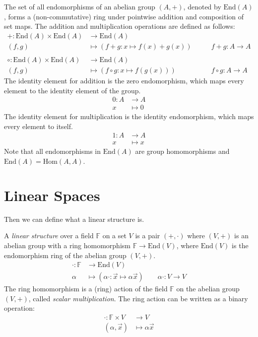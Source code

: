 \documentclass[
	11pt, %
	fleqn, %
	a4paper, %
]{LegrandOrangeBook}
\newcommand{\End}[1]{\text{End}(#1)} %
\newcommand{\Hom}{\text{Hom}} %
\newcommand{\F}{\mathbb{F}} %
\begin{document}
\begin{definition}
    The set of all endomorphisms of an abelian group $(A, +)$, denoted by $\End{A}$, forms a (non-commutative) ring under pointwise addition and composition of set maps. The addition and multiplication operations are defined as follows:
    \[
        \begin{split}
            + : \End{A} \times \End{A} &\to \End{A} \\
            (f,g) &\mapsto (f+g: x \mapsto f(x) + g(x)) \qquad &f + g : A \to A \\ \\
            \circ : \End{A} \times \End{A} &\to \End{A} \\
            (f,g) &\mapsto (f \circ g: x \mapsto f(g(x))) \qquad &f \circ g : A \to A
        \end{split}
    \]
    The identity element for addition is the zero endomorphism, which maps every element to the identity element of the group. 
    \[ \begin{split}
        0: A &\to A \\
        x &\mapsto 0
    \end{split}
    \]
    The identity element for multiplication is the identity endomorphism, which maps every element to itself. 
    \[
    \begin{split}
        1: A &\to A \\
        x &\mapsto x
    \end{split}
    \]
    Note that all endomorphisms in $\End{A}$ are group homomorphisms and $\End{A} = \Hom(A, A)$.
\end{definition}

\newpage

\section{Linear Spaces}

Then we can define what a linear structure is.

\begin{definition}
    A \emph{linear structure} over a field $\F$ on a set $V$ is a pair $(+, \cdot)$ where $(V, +)$ is an abelian group with a ring homomorphism $\F \to \End{V}$, where $\End{V}$ is the endomorphism ring of the abelian group $(V, +)$.
    \[ \begin{split}
            \cdot : \F &\to \End{V} \\
            \alpha &\mapsto (\alpha\cdot : \vec{x} \mapsto \alpha \vec{x}) \qquad \alpha \cdot : V \to V
        \end{split}
    \]
    The ring homomorphism is a (ring) action of the field $\F$ on the abelian group $(V, +)$, called \emph{scalar multiplication}. The ring action can be written as a binary operation:
    \[
        \begin{split}
            \cdot : \F \times V &\to V \\
            (\alpha, \vec{x}) &\mapsto \alpha \vec{x}
        \end{split}
    \]
\end{definition}
\end{document}

